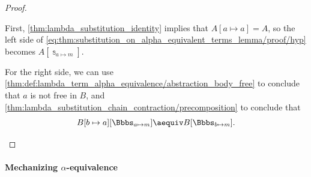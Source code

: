 \begin{proof}
\begin{itemize}
    First, \cref{thm:lambda_substitution_identity} implies that \( A[a \mapsto a] = A \), so the left side of \eqref{eq:thm:substitution_on_alpha_equivalent_terms_lemma/proof/hyp} becomes \( A[\Bbbs_{a \mapsto m}] \).

    For the right side, we can use \cref{thm:def:lambda_term_alpha_equivalence/abstraction_body_free} to conclude that \( a \) is not free in \( B \), and \cref{thm:lambda_substitution_chain_contraction/precomposition} to conclude that
    \begin{equation*}
      B[b \mapsto a][\Bbbs_{a \mapsto m}] \aequiv B[\Bbbs_{b \mapsto m}].
    \end{equation*}
  \end{itemize}
\end{proof}

\paragraph{Mechanizing \( \alpha \)-equivalence}

